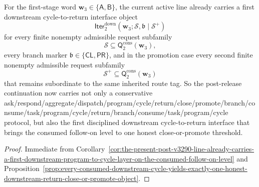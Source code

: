 \begin{corollary}
\label{cor:the-present-post-v3290-line-already-carries-a-first-downstream-cycle-to-return-interface-on-the-consumed-follow-on-level}
For the first-stage word \(\mathbf w_3\in\{\mathsf A,\mathsf B\}\), the current active line already carries a first downstream cycle-to-return interface object
\[
 \mathsf{Iter}^{\mathrm{down}}_{2}(\mathbf w_3;\mathcal S,\mathfrak b\mid\mathcal S^{+})
\]
for every finite nonempty admissible request subfamily
\[
 \mathcal S\subseteq \mathsf{Q}^{\mathrm{cons}}_{2}(\mathbf w_3),
\]
every branch marker \(\mathfrak b\in\{\mathsf{CL},\mathsf{PR}\}\), and in the promotion case every second finite nonempty admissible request subfamily
\[
 \mathcal S^{+}\subseteq \mathsf{Q}^{\mathrm{cons}}_{2}(\mathbf w_3)
\]
that remains subordinate to the same inherited route tag. So the post-release continuation now carries not only a conservative ask/\allowbreak{}respond/\allowbreak{}aggregate/\allowbreak{}dispatch/\allowbreak{}program/\allowbreak{}cycle/\allowbreak{}return/\allowbreak{}close/\allowbreak{}promote/\allowbreak{}branch/\allowbreak{}consume/\allowbreak{}task/\allowbreak{}program/\allowbreak{}cycle/\allowbreak{}return/\allowbreak{}branch/\allowbreak{}consume/\allowbreak{}task/\allowbreak{}program/\allowbreak{}cycle protocol, but also the first disciplined downstream cycle-to-return interface that brings the consumed follow-on level to one honest close-or-promote threshold.
\end{corollary}

\begin{proof}
Immediate from Corollary~\ref{cor:the-present-post-v3290-line-already-carries-a-first-downstream-program-to-cycle-layer-on-the-consumed-follow-on-level} and Proposition~\ref{prop:every-consumed-downstream-cycle-yields-exactly-one-honest-downstream-return-close-or-promote-object}.
\end{proof}

